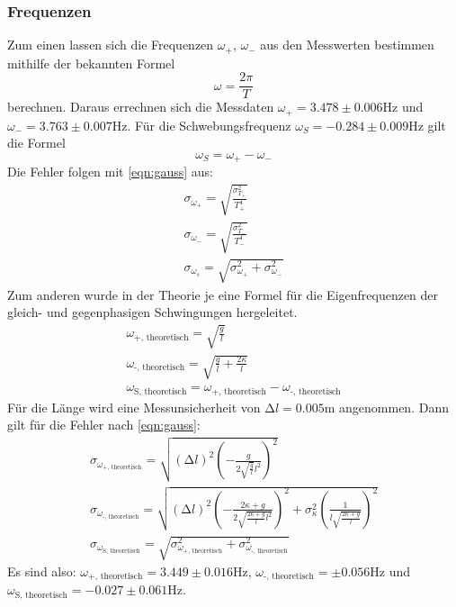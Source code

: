 \subsubsection{Frequenzen}
Zum einen lassen sich die Frequenzen $\omega_{+}$, $\omega_{-}$ aus den Messwerten bestimmen mithilfe der bekannten Formel
\begin{equation}
\omega = \frac{2 \pi}{T}
\label{durcht}
\end{equation}
berechnen. Daraus errechnen sich die Messdaten $\omega_{+} = 3.478\pm 0.006\si{\Hz}$ und $\omega_{-} = 3.763\pm 0.007\si{\Hz}$. Für die Schwebungsfrequenz $\omega_{S}=-0.284\pm 0.009\si{\Hz}$ gilt die Formel
\begin{equation}
\omega_{S} = \omega_{+} - \omega_{-}
\end{equation}
Die Fehler folgen mit \eqref{eqn:gauss} aus:
\begin{align}
\sigma_{\omega_{+}} = \sqrt{\frac{\sigma_{T_{+}}^{2}}{T_{+}^{4}}}\\
\sigma_{\omega_{-}} = \sqrt{\frac{\sigma_{T_{-}}^{2}}{T_{-}^{4}}}\\
\sigma_{\omega_{s}} = \sqrt{\sigma_{\omega_{+}}^2 + \sigma_{\omega_{-}}^2}
\end{align}
Zum anderen wurde in der Theorie je eine Formel für die Eigenfrequenzen 
der gleich- und gegenphasigen Schwingungen hergeleitet.
\begin{align}
\omega_\text{+, theoretisch} = \sqrt{\frac{g}{l}}\\
\omega_\text{-, theoretisch} = \sqrt{\frac{g}{l} + \frac{2 \kappa}{l}}\\
\omega_\text{S, theoretisch} = \omega_\text{+, theoretisch} - \omega_\text{-, theoretisch}
\label{eqn:omega}
\end{align}
Für die Länge wird eine Messunsicherheit von $\increment l = 0.005 \si{\m}$ angenommen. Dann gilt für die Fehler nach \eqref{eqn:gauss}:
\begin{align}
\sigma_{\omega_\text{+, theoretisch}} = \sqrt{(\increment l)^2 \left( -\frac{g}{2 \sqrt{\frac{g}{l}}l^2} \right)^2}\\
\sigma_{\omega_\text{-, theoretisch}} = \sqrt{(\increment l)^2 \left( -\frac{2 \kappa + g}{2 \sqrt{\frac{2 \kappa + g}{l}l^2}} \right)^2 + \sigma_{\kappa}^2 \left(\frac{1}{l \sqrt{\frac{2 \kappa + g}{l}}} \right)^2}\\
\sigma_{\omega_\text{S, theoretisch}} = \sqrt{\sigma_{\omega_\text{+, theoretisch}}^2 + \sigma_{\omega_\text{-, theoretisch}}^2}
\label{eqn:omegagauss}
\end{align}
Es sind also: $\omega_\text{+, theoretisch} = 3.449\pm 0.016 \si{\Hz}$, $\omega_\text{-, theoretisch} = \pm 0.056 \si{\Hz}$ und $\omega_\text{S, theoretisch} = -0.027 \pm 0.061\si{\Hz}$.


